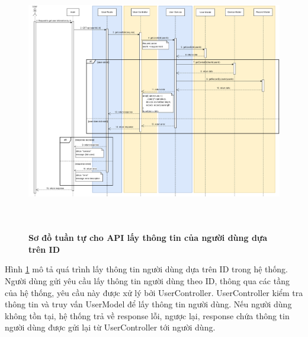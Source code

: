\begin{figure}[H]
  \centering
  \includegraphics[width=16cm,height=11.5cm]{Images/sequence_api/getUserById.png}
  \caption[Sơ đồ tuần tự cho API lấy thông tin của người dùng dựa trên ID ]{\bfseries \fontsize{12pt}{0pt}
  \selectfont Sơ đồ tuần tự cho API lấy thông tin của người dùng dựa trên ID }
  \label{getUserById} %
\end{figure}
Hình \ref{getUserById} mô tả quá trình lấy thông tin người dùng dựa trên ID trong hệ thống. Người dùng gửi yêu cầu lấy thông tin người dùng theo ID, thông qua các tầng của hệ thống, yêu cầu này được xử lý bởi UserController. UserController kiểm tra thông tin và truy vấn UserModel để lấy thông tin người dùng. 
Nếu người dùng không tồn tại, hệ thống trả về response lỗi, ngược lại, response chứa thông tin người dùng được gửi lại từ UserController tới người dùng.

